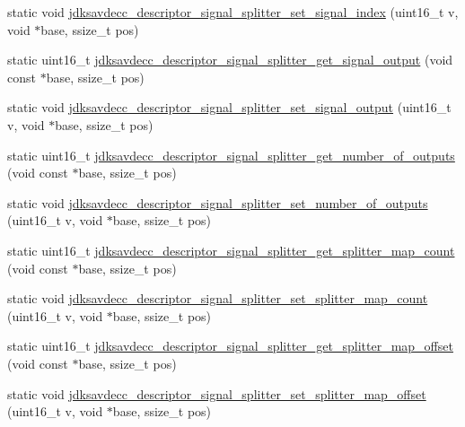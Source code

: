 \begin{DoxyCompactItemize}
\item 
static void \hyperlink{group__descriptor__signal__splitter_gafd6b7a18498019837f1737507537a9bd}{jdksavdecc\+\_\+descriptor\+\_\+signal\+\_\+splitter\+\_\+set\+\_\+signal\+\_\+index} (uint16\+\_\+t v, void $\ast$base, ssize\+\_\+t pos)
\item 
static uint16\+\_\+t \hyperlink{group__descriptor__signal__splitter_ga5d6cfd8e9ff9f49e6eb81be593ef0bf9}{jdksavdecc\+\_\+descriptor\+\_\+signal\+\_\+splitter\+\_\+get\+\_\+signal\+\_\+output} (void const $\ast$base, ssize\+\_\+t pos)
\item 
static void \hyperlink{group__descriptor__signal__splitter_gad0c19d1d2b9480f059e3b21d9c6584b5}{jdksavdecc\+\_\+descriptor\+\_\+signal\+\_\+splitter\+\_\+set\+\_\+signal\+\_\+output} (uint16\+\_\+t v, void $\ast$base, ssize\+\_\+t pos)
\item 
static uint16\+\_\+t \hyperlink{group__descriptor__signal__splitter_gab51a6ee84d2ffc4921e1d400b0ff6283}{jdksavdecc\+\_\+descriptor\+\_\+signal\+\_\+splitter\+\_\+get\+\_\+number\+\_\+of\+\_\+outputs} (void const $\ast$base, ssize\+\_\+t pos)
\item 
static void \hyperlink{group__descriptor__signal__splitter_ga6ee3245ce275236474b9e60f8b556de9}{jdksavdecc\+\_\+descriptor\+\_\+signal\+\_\+splitter\+\_\+set\+\_\+number\+\_\+of\+\_\+outputs} (uint16\+\_\+t v, void $\ast$base, ssize\+\_\+t pos)
\item 
static uint16\+\_\+t \hyperlink{group__descriptor__signal__splitter_gab3bf33fbc001d13105e82eabbdf0b6a6}{jdksavdecc\+\_\+descriptor\+\_\+signal\+\_\+splitter\+\_\+get\+\_\+splitter\+\_\+map\+\_\+count} (void const $\ast$base, ssize\+\_\+t pos)
\item 
static void \hyperlink{group__descriptor__signal__splitter_gaf3115c9b9fb36ce705bb648f1513684f}{jdksavdecc\+\_\+descriptor\+\_\+signal\+\_\+splitter\+\_\+set\+\_\+splitter\+\_\+map\+\_\+count} (uint16\+\_\+t v, void $\ast$base, ssize\+\_\+t pos)
\item 
static uint16\+\_\+t \hyperlink{group__descriptor__signal__splitter_gafa7541f8c5237eaba9c6f35bbedf61d6}{jdksavdecc\+\_\+descriptor\+\_\+signal\+\_\+splitter\+\_\+get\+\_\+splitter\+\_\+map\+\_\+offset} (void const $\ast$base, ssize\+\_\+t pos)
\item 
static void \hyperlink{group__descriptor__signal__splitter_ga1576dd48bf257db528152f1fe66e983e}{jdksavdecc\+\_\+descriptor\+\_\+signal\+\_\+splitter\+\_\+set\+\_\+splitter\+\_\+map\+\_\+offset} (uint16\+\_\+t v, void $\ast$base, ssize\+\_\+t pos)
\item 

\end{DoxyCompactItemize}
